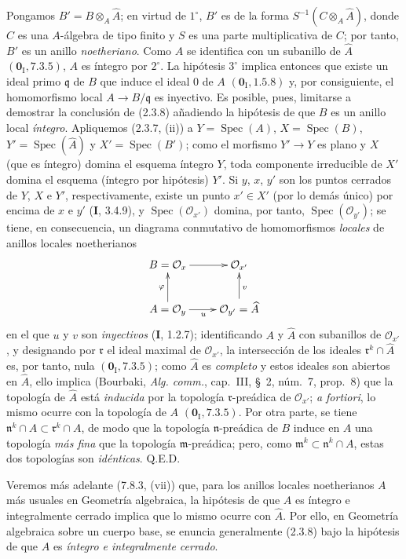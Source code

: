 Pongamos $B'=B\otimes_A\widehat A$; en virtud de $1^\circ$, $B'$ es de la
forma $S^{-1}(C\otimes_A\widehat A)$, donde $C$ es una $A$-álgebra de tipo
finito y $S$ es una parte multiplicativa de $C$; por tanto, $B'$ es un anillo
\emph{noetheriano}. Como $A$ se identifica con un subanillo de $\widehat A$
$(\mathbf{0}_{\mathrm I},7.3.5)$, $A$ es íntegro por $2^\circ$. La hipótesis
$3^\circ$ implica entonces que existe un ideal primo $\mathfrak q$ de $B$
que induce el ideal 0 de $A$ $(\mathbf{0}_{\mathrm I},1.5.8)$ y, por consiguiente, el
homomorfismo local $A\to B/\mathfrak q$ es inyectivo. Es posible, pues,
limitarse a demostrar la conclusión de (2.3.8) añadiendo la hipótesis de que
$B$ es un anillo local \emph{íntegro}. Apliquemos (2.3.7, (ii)) a
$Y=\operatorname{Spec}(A)$, $X=\operatorname{Spec}(B)$,
$Y'=\operatorname{Spec}(\widehat A)$ y $X'=\operatorname{Spec}(B')$; como el
morfismo $Y'\to Y$ es plano y $X$
(que es íntegro) domina el esquema íntegro
$Y$, toda componente irreducible de $X'$ domina el esquema (íntegro por
hipótesis) $Y'$. Si $y$, $x$, $y'$ son los puntos cerrados de $Y$, $X$ e
$Y'$, respectivamente, existe un punto $x'\in X'$ (por lo demás único) por
encima de $x$ e $y'$ (\textbf I, 3.4.9), y
$\operatorname{Spec}(\mathcal O_{x'})$ domina, por tanto,
$\operatorname{Spec}(\mathcal O_{y'})$; se tiene, en consecuencia, un
diagrama conmutativo de homomorfismos \emph{locales} de anillos locales noetherianos
\[
\xymatrix{
  B=\mathcal O_x \ar[r] & \mathcal O_{x'}\\
  A=\mathcal O_y \ar[u]^{\varphi} \ar[r]_{u} &
  \mathcal O_{y'}=\widehat A \ar[u]_{v}
}
\]
en el que $u$ y $v$ son \emph{inyectivos} (\textbf I, 1.2.7); identificando $A$ y
$\widehat A$ con subanillos de $\mathcal O_{x'}$, y designando por
$\mathfrak r$ el ideal maximal de $\mathcal O_{x'}$, la intersección de los
ideales $\mathfrak r^k\cap\widehat A$ es, por tanto, nula
$(\mathbf{0}_{\mathrm I},7.3.5)$; como $\widehat A$ es \emph{completo} y estos ideales son
abiertos en $\widehat A$, ello implica (Bourbaki, \emph{Alg. comm.},
cap.~III, \S~2, núm.~7, prop.~8) que la topología de $\widehat A$ está
\emph{inducida} por la topología $\mathfrak r$-preádica de $\mathcal O_{x'}$; \emph{a
fortiori}, lo mismo ocurre con la topología de $A$
$(\mathbf{0}_{\mathrm I},7.3.5)$. Por otra parte, se tiene
$\mathfrak n^k\cap A\subset\mathfrak r^k\cap A$, de modo que la topología
$\mathfrak n$-preádica de $B$ induce en $A$ una topología \emph{más fina} que la
topología $\mathfrak m$-preádica; pero, como
$\mathfrak m^k\subset\mathfrak n^k\cap A$, estas dos topologías son
\emph{idénticas}. Q.E.D.

\begin{remark}[2.3.9]
\label{IV.2.3.9-fr}
Veremos más adelante (7.8.3, (vii)) que, para los anillos locales noetherianos
$A$ más usuales en Geometría algebraica, la hipótesis de que $A$ es íntegro e
integralmente cerrado implica que lo mismo ocurre con $\widehat A$. Por ello,
en Geometría algebraica sobre un cuerpo base, se enuncia generalmente (2.3.8)
bajo la hipótesis de que $A$ es \emph{íntegro e integralmente cerrado}.
\end{remark}
